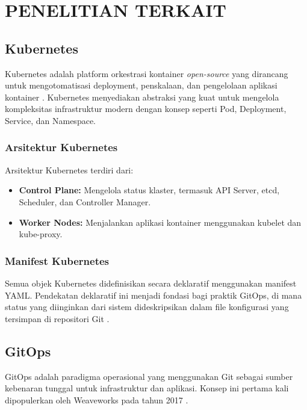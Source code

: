 \chapter{PENELITIAN TERKAIT}

\section{Kubernetes}

Kubernetes adalah platform orkestrasi kontainer \textit{open-source} yang dirancang untuk mengotomatisasi deployment, penskalaan, dan pengelolaan aplikasi kontainer \citep{kubernetes2022}. Kubernetes menyediakan abstraksi yang kuat untuk mengelola kompleksitas infrastruktur modern dengan konsep seperti Pod, Deployment, Service, dan Namespace.

\subsection{Arsitektur Kubernetes}

Arsitektur Kubernetes terdiri dari:

\begin{itemize}
    \item \textbf{Control Plane:} Mengelola status klaster, termasuk API Server, etcd, Scheduler, dan Controller Manager.
    \item \textbf{Worker Nodes:} Menjalankan aplikasi kontainer menggunakan kubelet dan kube-proxy.
\end{itemize}

\subsection{Manifest Kubernetes}

Semua objek Kubernetes didefinisikan secara deklaratif menggunakan manifest YAML. Pendekatan deklaratif ini menjadi fondasi bagi praktik GitOps, di mana status yang diinginkan dari sistem dideskripsikan dalam file konfigurasi yang tersimpan di repositori Git \citep{kubernetes-docs}.

\section{GitOps}

GitOps adalah paradigma operasional yang menggunakan Git sebagai sumber kebenaran tunggal untuk infrastruktur dan aplikasi. Konsep ini pertama kali dipopulerkan oleh Weaveworks pada tahun 2017 \citep{weaveworks-gitops}.

